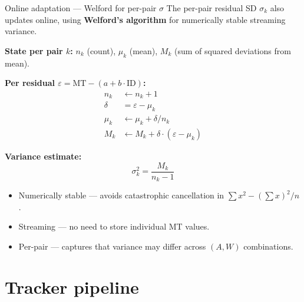 \documentclass[10pt,aspectratio=169]{beamer}
\begin{document}
\begin{frame}{Online adaptation --- Welford for per-pair $\sigma$}
The per-pair residual SD $\sigma_k$ also updates online, using \textbf{Welford's algorithm} for numerically stable streaming variance.

\textbf{State per pair $k$:} $n_k$ (count), $\mu_k$ (mean), $M_k$ (sum of squared deviations from mean).

\textbf{Per residual $\varepsilon = \text{MT} - (a + b \cdot \text{ID})$:}
\begin{align*}
n_k &\leftarrow n_k + 1 \\
\delta &= \varepsilon - \mu_k \\
\mu_k &\leftarrow \mu_k + \delta / n_k \\
M_k &\leftarrow M_k + \delta \cdot (\varepsilon - \mu_k)
\end{align*}

\textbf{Variance estimate:}
\[
\sigma_k^2 = \frac{M_k}{n_k - 1}
\]

\begin{itemize}
    \item Numerically stable --- avoids catastrophic cancellation in $\sum x^2 - (\sum x)^2 / n$.
    \item Streaming --- no need to store individual MT values.
    \item Per-pair --- captures that variance may differ across $(A, W)$ combinations.
\end{itemize}
\end{frame}

\section{Tracker pipeline}
\end{document}
